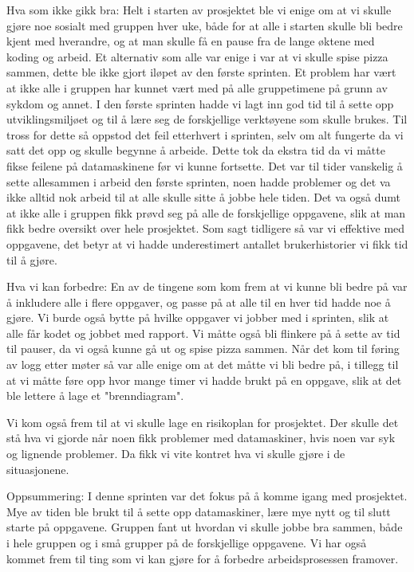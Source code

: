 \documentclass[12pt,a4paper,norsk]{article}
\begin{document}
Hva som ikke gikk bra:
Helt i starten av prosjektet ble vi enige om at vi skulle gjøre noe sosialt med gruppen hver uke, både for at alle i starten skulle bli bedre kjent med hverandre, og at man skulle få en pause fra de lange øktene med koding og arbeid. Et alternativ som alle var enige i var at vi skulle spise pizza sammen, dette ble ikke gjort iløpet av den første sprinten.  
Et problem har vært at ikke alle i gruppen har kunnet vært med på alle gruppetimene på grunn av sykdom og annet. 
I den første sprinten hadde vi lagt inn god tid til å sette opp utviklingsmiljøet og til å lære seg de forskjellige verktøyene som skulle brukes. Til tross for dette så oppstod det feil etterhvert i sprinten, selv om alt fungerte da vi satt det opp og skulle begynne å arbeide. Dette tok da ekstra tid da vi måtte fikse feilene på datamaskinene før vi kunne fortsette. 
Det var til tider vanskelig å sette allesammen i arbeid den første sprinten, noen hadde problemer og det va ikke alltid nok arbeid til at alle skulle sitte å jobbe hele tiden. Det va også dumt at ikke alle i gruppen fikk prøvd seg på alle de forskjellige oppgavene, slik at man fikk bedre oversikt over hele prosjektet. 
Som sagt tidligere så var vi effektive med oppgavene, det betyr at vi hadde underestimert antallet brukerhistorier vi fikk tid til å gjøre.


Hva vi kan forbedre:
En av de tingene som kom frem at vi kunne bli bedre på var å inkludere alle i flere oppgaver, og passe på at alle til en hver tid hadde noe å gjøre. Vi burde også bytte på hvilke oppgaver vi jobber med i sprinten, slik at alle får kodet og jobbet med rapport.
Vi måtte også bli flinkere på å sette av tid til pauser, da vi også kunne gå ut og spise pizza sammen. 
Når det kom til føring av logg etter møter så var alle enige om at det måtte vi bli bedre på, i tillegg til at vi måtte føre opp hvor mange timer vi hadde brukt på en oppgave, slik at det ble lettere å lage et "brenndiagram".

Vi kom også frem til at vi skulle lage en risikoplan for prosjektet. Der skulle det stå hva vi gjorde når noen fikk problemer med datamaskiner, hvis noen var syk og lignende problemer. Da fikk vi vite kontret hva vi skulle gjøre i de situasjonene. 

Oppsummering:
I denne sprinten var det fokus på å komme igang med prosjektet. Mye av tiden ble brukt til å sette opp datamaskiner, lære mye nytt og til slutt starte på oppgavene. Gruppen fant ut hvordan vi skulle jobbe bra sammen, både i hele gruppen og i små grupper på de forskjellige oppgavene. Vi har også kommet frem til ting som vi kan gjøre for å forbedre arbeidsprosessen framover. 
\end{document}

